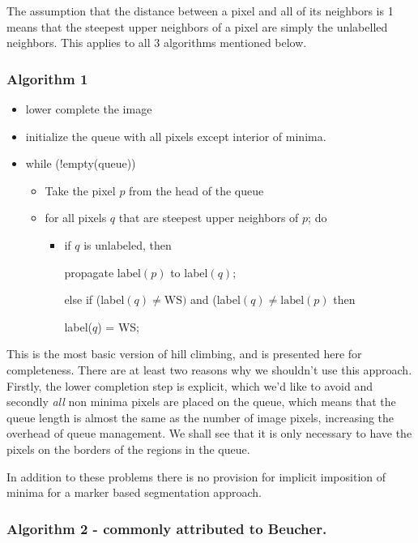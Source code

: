 \documentclass{InsightArticle}
\begin{document}
The assumption that the distance between a pixel and all of its
neighbors is 1 means that the steepest upper neighbors of a pixel are
simply the unlabelled neighbors. This applies to all 3 algorithms
mentioned below.

\subsubsection{Algorithm 1}

\begin{itemize}
\item lower complete the image
\item initialize the queue with all pixels except interior of minima.
\item while (!empty(queue))
   \begin{itemize}
	\item Take the pixel $p$ from the head of the queue
        \item for all pixels $q$ that are steepest upper neighbors of $p$; do
        \begin{itemize}
         \item  if $q$ is unlabeled, then 

propagate label$(p)$ to label$(q)$;

                else if (label$(q) \ne \mbox{WS})$ and  (label$(q) \ne \mbox{label}(p)$ then

                  label($q$) = WS;
	\end{itemize}

   \end{itemize}
\end{itemize}

This is the most basic version of hill climbing, and is presented here
for completeness. There are at least two reasons why we shouldn't use
this approach. Firstly, the lower completion step is explicit, which
we'd like to avoid and secondly {\em all} non minima pixels are placed
on the queue, which means that the queue length is almost the same as
the number of image pixels, increasing the overhead of queue
management. We shall see that it is only necessary to have the pixels
on the borders of the regions in the queue.

In addition to these problems there is no provision for implicit
imposition of minima for a marker based segmentation approach.


\subsubsection{Algorithm 2 - commonly attributed to Beucher.}
\label{sect:BeucherAlgorithm}
\end{document}
